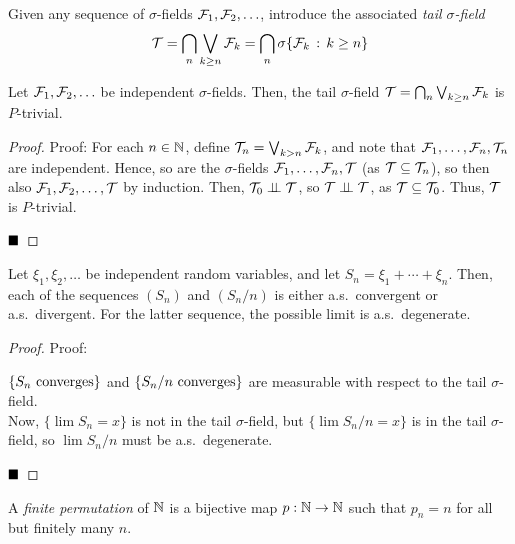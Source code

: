 \begin{definition}
    Given any sequence of $\sigma$-fields $\cal{F}_1, \cal{F}_2, \ldots$, introduce the associated \emph{tail $\sigma$-field}
    \[ \cal{T} = \bigcap_{n} \bigvee_{k \geq n} \cal{F}_k = \bigcap_{n} \sigma\{\cal{F}_k \col k \geq n\} \]
\end{definition}

\begin{theorem}
    Let $\cal{F}_1, \cal{F}_2, \ldots$ be independent $\sigma$-fields. Then, the tail $\sigma$-field $\cal{T} = \bigcap_{n} \bigvee_{k \geq n} \cal{F}_k$ is $P$-trivial.
\end{theorem}
\begin{proof}{Proof:}
    For each $n \in \N$, define $\cal{T}_n = \bigvee_{k > n} \cal{F}_k$, and note that $\cal{F}_1, \ldots, \cal{F}_n, \cal{T}_n$ are independent. Hence, so are the $\sigma$-fields $\cal{F}_1, \ldots, \cal{F}_n, \cal{T}$ (as $\cal{T} \subseteq \cal{T}_n$), so then also $\cal{F}_1, \cal{F}_2, \ldots, \cal{T}$ by induction. Then, $\cal{T}_0 \perp\!\!\!\perp \cal{T}$, so $\cal{T} \perp\!\!\!\perp \cal{T}$, as $\cal{T} \subseteq \cal{T}_0$. Thus, $\cal{T}$ is $P$-trivial.

    $\qed$
\end{proof}

\begin{lemma}
    Let $\xi_1, \xi_2, \ldots$ be independent random variables, and let $S_n = \xi_1 + \cdots + \xi_n$. Then, each of the sequences $(S_n)$ and $(S_n/n)$ is either a.s.\ convergent or a.s.\ divergent. For the latter sequence, the possible limit is a.s.\ degenerate.
\end{lemma}
\begin{proof}{Proof:}
 
    $\{S_n \tt{ converges}\}$ and $\{S_n/n \tt{ converges}\}$ are measurable with respect to the tail $\sigma$-field.\\

    Now, $\{\lim S_n = x\}$ is not in the tail $\sigma$-field, but $\{\lim S_n/n = x\}$ is in the tail $\sigma$-field, so $\lim S_n/n$ must be a.s.\ degenerate.

    $\qed$
\end{proof}

\begin{definition}
    A \emph{finite permutation} of $\N$ is a bijective map $p : \N \to \N$ such that $p_n = n$ for all but finitely many $n$.
\end{definition}

